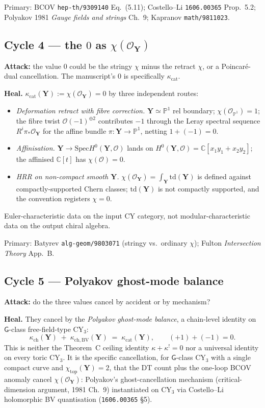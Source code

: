 \documentclass[11pt]{amsart}
\theoremstyle{definition}
\providecommand{\bY}{\mathbf{Y}}
\providecommand{\cO}{\mathcal{O}}
\providecommand{\bC}{\mathbb{C}}
\providecommand{\bP}{\mathbb{P}}
\providecommand{\Spec}{\mathrm{Spec}}
\begin{document}
Primary: BCOV \texttt{hep-th/9309140} Eq.~(5.11);
Costello--Li \texttt{1606.00365} Prop.~5.2;
Polyakov 1981 \emph{Gauge fields and strings} Ch.~9;
Kapranov \texttt{math/9811023}.

\subsection*{Cycle 4 --- the $0$ as $\chi(\cO_\bY)$}

\textbf{Attack:} the value $0$ could be the stringy $\chi$ minus
the retract $\chi$, or a Poincaré-dual cancellation. The
manuscript's $0$ is specifically $\kappa_{\mathrm{cat}}$.

\textbf{Heal.} $\kappa_{\mathrm{cat}}(\bY) := \chi(\cO_\bY) = 0$ by
three independent routes:
\begin{itemize}[leftmargin=2em]
\item \emph{Deformation retract with fibre correction.}
  $\bY \simeq \bP^1$ rel boundary; $\chi(\cO_{\bP^1}) = 1$; the
  fibre twist $\cO(-1)^{\oplus 2}$ contributes $-1$ through the
  Leray spectral sequence $R^i \pi_* \cO_\bY$ for the affine
  bundle $\pi : \bY \to \bP^1$, netting $1 + (-1) = 0$.
\item \emph{Affinisation.}
  $\bY \to \Spec H^0(\bY, \cO)$ lands on
  $H^0(\bY, \cO) = \bC[x_1 y_1 + x_2 y_2]$; the affinised
  $\bC[t]$ has $\chi(\cO) = 0$.
\item \emph{HRR on non-compact smooth $\bY$.}
  $\chi(\cO_\bY) = \int_\bY \mathrm{td}(\bY)$ is defined against
  compactly-supported Chern classes; $\mathrm{td}(\bY)$ is not
  compactly supported, and the convention registers $\chi = 0$.
\end{itemize}
Euler-characteristic data on the input CY category, not
modular-characteristic data on the output chiral algebra.

Primary: Batyrev \texttt{alg-geom/9803071} (stringy vs.\ ordinary
$\chi$); Fulton \emph{Intersection Theory} App.~B.

\subsection*{Cycle 5 --- Polyakov ghost-mode balance}

\textbf{Attack:} do the three values cancel by accident or by
mechanism?

\textbf{Heal.} They cancel by the \emph{Polyakov ghost-mode
balance}, a chain-level identity on $\mathsf G$-class
free-field-type CY$_3$:
\begin{equation*}
 \kappa_{\mathrm{ch}}(\bY) \;+\; \kappa_{\mathrm{ch,BV}}(\bY)
  \;=\; \kappa_{\mathrm{cat}}(\bY),
 \qquad (+1) + (-1) = 0.
\end{equation*}
This is neither the Theorem~C ceiling identity
$\kappa + \kappa^! = 0$ nor a universal identity on every toric
CY$_3$. It is the specific cancellation, for $\mathsf G$-class
CY$_3$ with a single compact curve and
$\chi_{\mathrm{top}}(\bY) = 2$, that the DT count plus the
one-loop BCOV anomaly cancel $\chi(\cO_\bY)$: Polyakov's
ghost-cancellation mechanism (critical-dimension argument, 1981
Ch.~9) instantiated on CY$_3$ via Costello--Li holomorphic BV
quantisation (\texttt{1606.00365} §5).
\end{document}
